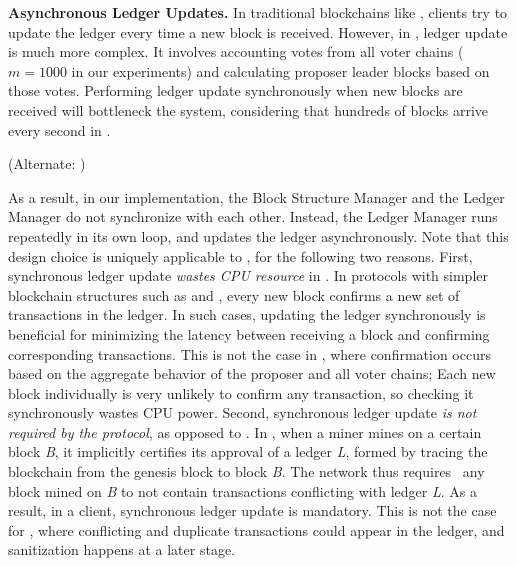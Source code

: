 \textbf{Asynchronous Ledger Updates.}
In traditional blockchains like \bitcoin, clients try to update the ledger every time a new block is received.
However, in \prism, ledger update is much more complex. It involves accounting votes from all voter chains ($m=1000$ in our experiments) and calculating proposer leader blocks based on those votes. Performing ledger update synchronously when new blocks are received will bottleneck the system, considering that hundreds of blocks arrive every second in \prism.



(Alternate: )

As a result, in our \prism implementation, the Block Structure Manager and the Ledger Manager do not synchronize with each other. Instead, the Ledger Manager runs repeatedly in its own loop, and updates the ledger asynchronously. Note that this design choice is uniquely applicable to \prism, for the following two reasons. First, synchronous ledger update \textit{wastes CPU resource} in \prism. In protocols with simpler blockchain structures such as \bitcoin and \algorand, every new block confirms a new set of transactions in the ledger. In such cases, updating the ledger synchronously is beneficial for minimizing the latency between receiving a block and confirming corresponding transactions. This is not the case in \prism, where confirmation occurs based on the aggregate behavior of the proposer and all voter chains; Each new block individually is very unlikely to confirm any transaction, so checking it synchronously wastes CPU power. Second, synchronous ledger update \textit{is not required by the protocol}, as opposed to \bitcoin. In \bitcoin, when a miner mines on a certain block \textit{B}, it implicitly certifies its approval of a ledger \textit{L}, formed by tracing the blockchain from the genesis block to block \textit{B}. The network thus requires~\cite{bitcoin} any block mined on \textit{B} to not contain transactions conflicting with ledger \textit{L}. As a result, in a \bitcoin client, synchronous ledger update is mandatory. This is not the case for \prism, where conflicting and duplicate transactions could appear in the ledger, and sanitization happens at a later stage.



